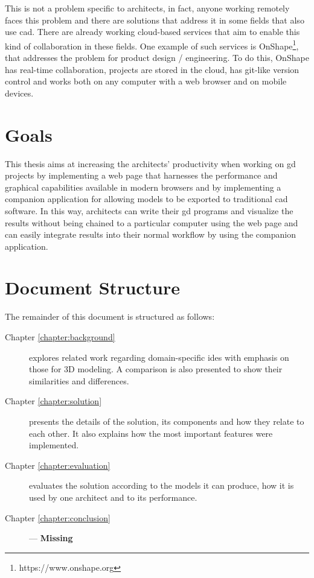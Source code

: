 This is not a problem specific to architects, in fact, anyone working remotely faces this problem and there are solutions that address it in some fields that also use \gls{cad}.
There are already working cloud-based services that aim to enable this kind of collaboration in these fields.
One example of such services is OnShape\footnote{https://www.onshape.org}, that addresses the problem for product design / engineering.
To do this, OnShape has real-time collaboration, projects are stored in the cloud, has git-like version control and works both on any computer with a web browser and on mobile devices.


\section{Goals}
This thesis aims at increasing the architects' productivity when working on \gls{gd} projects by implementing a web page that harnesses the performance and graphical capabilities available in modern browsers and by implementing a companion application for allowing models to be exported to traditional \gls{cad} software.
In this way, architects can write their \gls{gd} programs and visualize the results without being chained to a particular computer using the web page and can easily integrate results into their normal workflow by using the companion application.


\section{Document Structure}
The remainder of this document is structured as follows:
\begin{description}
  \item[Chapter \ref{chapter:background}] explores related work regarding domain-specific \glspl{ide} with emphasis on those for 3D modeling. A comparison is also presented to show their similarities and differences.
  \item[Chapter \ref{chapter:solution}] presents the details of the solution, its components and how they relate to each other. It also explains how the most important features were implemented.
  \item[Chapter \ref{chapter:evaluation}] evaluates the solution according to the models it can produce, how it is used by one architect and to its performance.
  \item[Chapter \ref{chapter:conclusion}] --- {\bf Missing }
\end{description}


